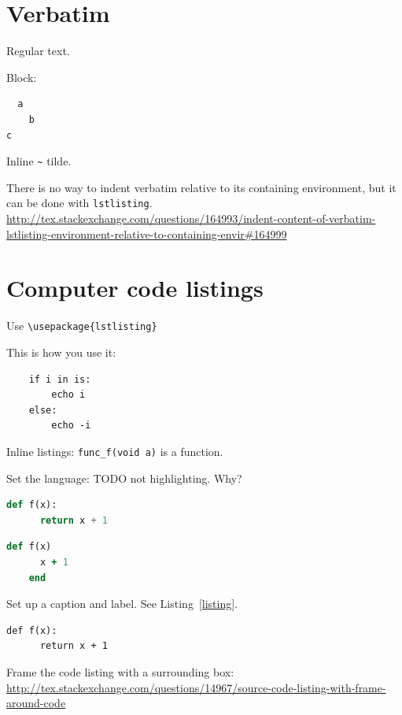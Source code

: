\documentclass[12pt]{article}
\begin{document}
\section{Verbatim}\label{verbatim}

  Regular text.

  Block:

  \begin{verbatim}
  a
    b
c
  \end{verbatim}

  Inline \verb|~| tilde.

  There is no way to indent verbatim relative to its containing environment, but it can be done with \lstinline|lstlisting|. \url{http://tex.stackexchange.com/questions/164993/indent-content-of-verbatim-lstlisting-environment-relative-to-containing-envir#164999}

\section{Computer code listings}\label{computer-code}

  Use \lstinline|\usepackage{lstlisting}|

  This is how you use it:

  \begin{lstlisting}
    if i in is:
        echo i
    else:
        echo -i
  \end{lstlisting}

  Inline listings: \lstinline|func_f(void a)| is a function.

  Set the language: TODO not highlighting. Why?

  \begin{lstlisting}[language=Python]
    def f(x):
      return x + 1
  \end{lstlisting}

  \begin{lstlisting}[language=Ruby]
    def f(x)
      x + 1
    end
  \end{lstlisting}

  Set up a caption and label. See Listing~\ref{listing}.

  \begin{lstlisting}[label=listing, caption={Listing with caption and label.}]
    def f(x):
      return x + 1
  \end{lstlisting}

  Frame the code listing with a surrounding box: \url{http://tex.stackexchange.com/questions/14967/source-code-listing-with-frame-around-code}
\end{document}
